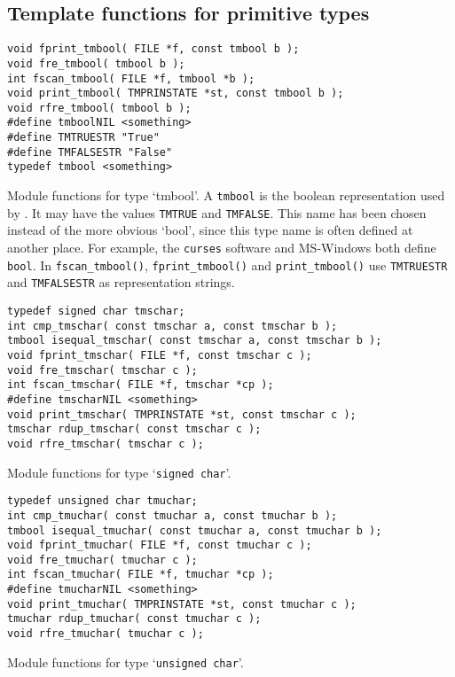 \subsection{Template functions for primitive types}
\label{s.primtype}
\begin{verbatim}
void fprint_tmbool( FILE *f, const tmbool b );
void fre_tmbool( tmbool b );
int fscan_tmbool( FILE *f, tmbool *b );
void print_tmbool( TMPRINSTATE *st, const tmbool b );
void rfre_tmbool( tmbool b );
#define tmboolNIL <something>
#define TMTRUESTR "True"
#define TMFALSESTR "False"
typedef tmbool <something>
\end{verbatim}
\begin{desc}
Module functions for type `tmbool'.
A {\tt tmbool} is the boolean representation used by {\Tm}.
It may have the values {\tt TMTRUE} and {\tt TMFALSE}.
This name has been chosen instead of the more obvious `bool',
since this type name is often defined at another place.
For example, the {\tt curses} software and MS-Windows both define {\tt bool}.
In {\tt fscan\_tmbool()}, {\tt fprint\_tmbool()} and {\tt print\_tmbool()}
use {\tt TMTRUESTR} and {\tt TMFALSESTR} as representation strings.
\end{desc}
\begin{verbatim}
typedef signed char tmschar;
int cmp_tmschar( const tmschar a, const tmschar b );
tmbool isequal_tmschar( const tmschar a, const tmschar b );
void fprint_tmschar( FILE *f, const tmschar c );
void fre_tmschar( tmschar c );
int fscan_tmschar( FILE *f, tmschar *cp );
#define tmscharNIL <something>
void print_tmschar( TMPRINSTATE *st, const tmschar c );
tmschar rdup_tmschar( const tmschar c );
void rfre_tmschar( tmschar c );
\end{verbatim}
\begin{desc}
Module functions for type `{\tt signed char}'.
\end{desc}
\begin{verbatim}
typedef unsigned char tmuchar;
int cmp_tmuchar( const tmuchar a, const tmuchar b );
tmbool isequal_tmuchar( const tmuchar a, const tmuchar b );
void fprint_tmuchar( FILE *f, const tmuchar c );
void fre_tmuchar( tmuchar c );
int fscan_tmuchar( FILE *f, tmuchar *cp );
#define tmucharNIL <something>
void print_tmuchar( TMPRINSTATE *st, const tmuchar c );
tmuchar rdup_tmuchar( const tmuchar c );
void rfre_tmuchar( tmuchar c );
\end{verbatim}
\begin{desc}
Module functions for type `{\tt unsigned char}'.
\end{desc}
